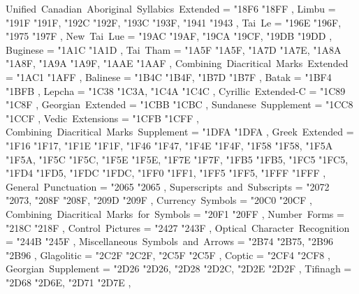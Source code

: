 {    Unified~Canadian~Aboriginal~Syllabics~Extended = { {"18F6} {"18FF} },
    Limbu                                          = { {"191F} {"191F}, {"192C} {"192F}, {"193C} {"193F}, {"1941} {"1943} },
    Tai~Le                                         = { {"196E} {"196F}, {"1975} {"197F} },
    New~Tai~Lue                                    = { {"19AC} {"19AF}, {"19CA} {"19CF}, {"19DB} {"19DD} },
    Buginese                                       = { {"1A1C} {"1A1D} },
    Tai~Tham                                       = { {"1A5F} {"1A5F}, {"1A7D} {"1A7E}, {"1A8A} {"1A8F}, {"1A9A} {"1A9F}, {"1AAE} {"1AAF} },
    Combining~Diacritical~Marks~Extended           = { {"1AC1} {"1AFF} },
    Balinese                                       = { {"1B4C} {"1B4F}, {"1B7D} {"1B7F} },
    Batak                                          = { {"1BF4} {"1BFB} },
    Lepcha                                         = { {"1C38} {"1C3A}, {"1C4A} {"1C4C} },
    Cyrillic~Extended-C                            = { {"1C89} {"1C8F} },
    Georgian~Extended                              = { {"1CBB} {"1CBC} },
    Sundanese~Supplement                           = { {"1CC8} {"1CCF} },
    Vedic~Extensions                               = { {"1CFB} {"1CFF} },
    Combining~Diacritical~Marks~Supplement         = { {"1DFA} {"1DFA} },
    Greek~Extended                                 = { {"1F16} {"1F17}, {"1F1E} {"1F1F}, {"1F46} {"1F47}, {"1F4E} {"1F4F}, {"1F58} {"1F58}, {"1F5A} {"1F5A}, {"1F5C} {"1F5C}, {"1F5E} {"1F5E}, {"1F7E} {"1F7F}, {"1FB5} {"1FB5}, {"1FC5} {"1FC5}, {"1FD4} {"1FD5}, {"1FDC} {"1FDC}, {"1FF0} {"1FF1}, {"1FF5} {"1FF5}, {"1FFF} {"1FFF} },
    General~Punctuation                            = { {"2065} {"2065} },
    Superscripts~and~Subscripts                    = { {"2072} {"2073}, {"208F} {"208F}, {"209D} {"209F} },
    Currency~Symbols                               = { {"20C0} {"20CF} },
    Combining~Diacritical~Marks~for~Symbols        = { {"20F1} {"20FF} },
    Number~Forms                                   = { {"218C} {"218F} },
    Control~Pictures                               = { {"2427} {"243F} },
    Optical~Character~Recognition                  = { {"244B} {"245F} },
    Miscellaneous~Symbols~and~Arrows               = { {"2B74} {"2B75}, {"2B96} {"2B96} },
    Glagolitic                                     = { {"2C2F} {"2C2F}, {"2C5F} {"2C5F} },
    Coptic                                         = { {"2CF4} {"2CF8} },
    Georgian~Supplement                            = { {"2D26} {"2D26}, {"2D28} {"2D2C}, {"2D2E} {"2D2F} },
    Tifinagh                                       = { {"2D68} {"2D6E}, {"2D71} {"2D7E} },
}
